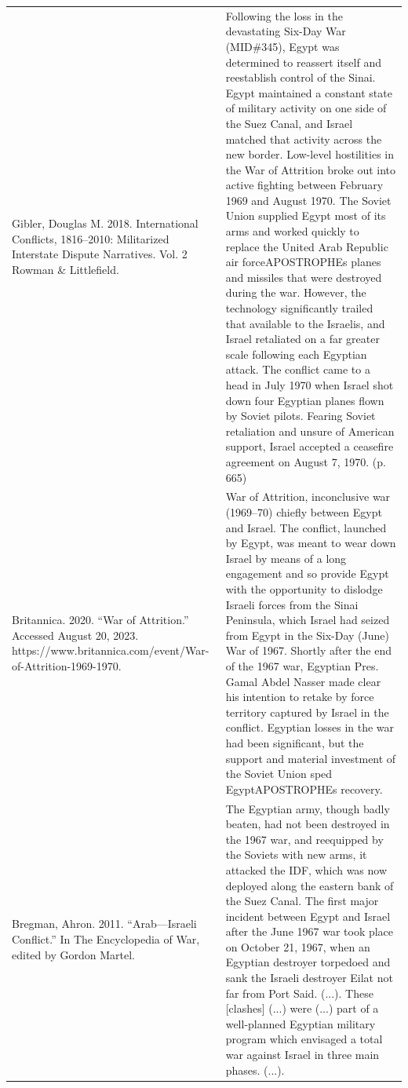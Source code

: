 {\begin{longtable}{p{}p{}}
Gibler, Douglas M. 2018. International Conflicts, 1816–2010: Militarized Interstate Dispute Narratives. Vol. 2 Rowman \& Littlefield. & Following the loss in the devastating Six-Day War (MID\#345), Egypt was determined to reassert itself and reestablish control of the Sinai. Egypt maintained a constant state of military activity on one side of the Suez Canal, and Israel matched that activity across the new border. Low-level hostilities in the War of Attrition broke out into active fighting between February 1969 and August 1970. The Soviet Union supplied Egypt most of its arms and worked quickly to replace the United Arab Republic air forceAPOSTROPHEs planes and missiles that were destroyed during the war. However, the technology significantly trailed that available to the Israelis, and Israel retaliated on a far greater scale following each Egyptian attack. The conflict came to a head in July 1970 when Israel shot down four Egyptian planes flown by Soviet pilots. Fearing Soviet retaliation and unsure of American support, Israel accepted a ceasefire agreement on August 7, 1970. (p. 665)
\\
Britannica. 2020. “War of Attrition.” Accessed August 20, 2023. https://www.britannica.com/event/War-of-Attrition-1969-1970. & War of Attrition, inconclusive war (1969–70) chiefly between Egypt and Israel. The conflict, launched by Egypt, was meant to wear down Israel by means of a long engagement and so provide Egypt with the opportunity to dislodge Israeli forces from the Sinai Peninsula, which Israel had seized from Egypt in the Six-Day (June) War of 1967. Shortly after the end of the 1967 war, Egyptian Pres. Gamal Abdel Nasser made clear his intention to retake by force territory captured by Israel in the conflict. Egyptian losses in the war had been significant, but the support and material investment of the Soviet Union sped EgyptAPOSTROPHEs recovery.
\\
Bregman, Ahron. 2011. “Arab—Israeli Conflict.” In The Encyclopedia of War, edited by Gordon Martel. & The Egyptian army, though badly beaten, had not been destroyed in the 1967 war, and reequipped by the Soviets with new arms, it attacked the IDF, which was now deployed along the eastern bank of the Suez Canal. The first major incident between Egypt and Israel after the June 1967 war took place on October 21, 1967, when an Egyptian destroyer torpedoed and sank the Israeli destroyer Eilat not far from Port Said. (...).
These [clashes] (...) were (...) part of a well-planned Egyptian military program which envisaged a total war against Israel in three main phases. (...).

\end{longtable}}
